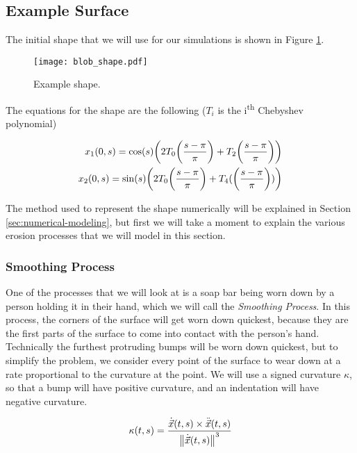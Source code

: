 \subsection*{Example Surface}

The initial shape that we will use for our simulations is shown in Figure \ref{fig:blob-shape}.

\begin{figure}[H]
  \begin{center}
    \texttt{[image: blob\_shape.pdf]}
  \end{center}
  \vspace{-.2in} %
  \caption{\label{fig:blob-shape} Example shape.}
\end{figure}

The equations for the shape are the following ($T_i$ is the i\textsuperscript{th} Chebyshev polynomial)

\begin{align*}
  x_1(0, s) = \cos(s) \paren{2 T_0\paren{\frac{s-\pi}{\pi}} + T_2\paren{\frac{s-\pi}{\pi}}}\\
  x_2(0, s) = \sin(s) \paren{2 T_0\paren{\frac{s-\pi}{\pi}} + T_4(\paren{\frac{s-\pi}{\pi}})}
\end{align*}

The method used to represent the shape numerically will be explained in Section \ref{sec:numerical-modeling}, but first we will take a moment to explain the various erosion processes that we will model in this section.

\subsubsection*{Smoothing Process}

One of the processes that we will look at is a soap bar being worn down by a person holding it in their hand, which we will call the \textit{Smoothing Process}. In this process, the corners of the surface will get worn down quickest, because they are the first parts of the surface to come into contact with the person's hand. Technically the furthest protruding bumps will be worn down quickest, but to simplify the problem, we consider every point of the surface to wear down at a rate proportional to the curvature at the point. We will use a signed curvature $\kappa$, so that a bump will have positive curvature, and an indentation will have negative curvature. 

\[
  \kappa(t, s) = \frac{\dot{\vec{x}}(t, s) \times \ddot{\vec{x}}(t, s)}{\norm{\dot{\vec{x}}(t, s)}^3}
\]

